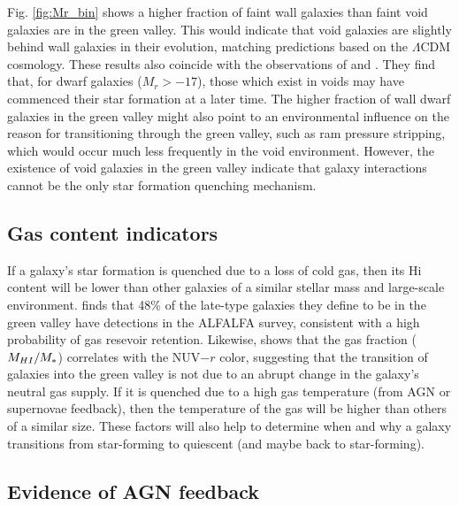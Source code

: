 Fig. \ref{fig:Mr_bin} shows a higher fraction of faint wall galaxies than faint 
void galaxies are in the green valley.  This would indicate that void galaxies 
are slightly behind wall galaxies in their evolution, matching predictions based 
on the $\Lambda$CDM cosmology.  These results also coincide with the 
observations of \cite{Douglass17b} and \cite{Douglass17c}.  They find that, for 
dwarf galaxies ($M_r > -17$), those which exist in voids may have commenced 
their star formation at a later time.  The higher fraction of wall dwarf 
galaxies in the green valley might also point to an environmental influence on 
the reason for transitioning through the green valley, such as ram pressure 
stripping, which would occur much less frequently in the void environment.  
However, the existence of void galaxies in the green valley indicate that galaxy 
interactions cannot be the only star formation quenching mechanism.


\subsection{Gas content indicators}

If a galaxy's star formation is quenched due to a loss of cold gas, then its 
H{\sc i} content will be lower than other galaxies of a similar stellar mass and 
large-scale environment.  \cite{Schawinski14} finds that 48\% of the late-type 
galaxies they define to be in the green valley have  detections in the 
ALFALFA survey, consistent with a high probability of gas resevoir retention.  
Likewise, \cite{Catinella12} shows that the gas fraction ($M_{\ion{H}{1}}/M_*$) 
correlates with the NUV$-r$ color, suggesting that the transition of galaxies 
into the green valley is not due to an abrupt change in the galaxy's neutral gas 
supply.  If it is quenched due to a high gas temperature (from AGN or supernovae 
feedback), then the temperature of the gas will be higher than others of a 
similar size.  These factors will also help to determine when and why a galaxy 
transitions from star-forming to quiescent (and maybe back to star-forming).


\subsection{Evidence of AGN feedback}

